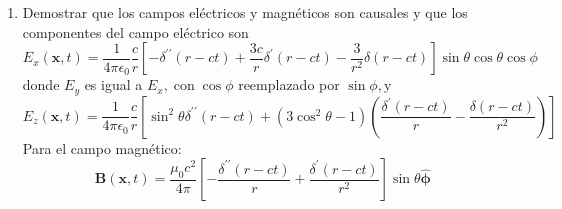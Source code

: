 \documentclass[]{article}
\numberwithin{equation}{section}
\newcommand{\0}{\textcolor{gray}{0}}
\newcommand{\rv}{\mathbf{r}}
\newcommand{\xv}{\mathbf{x}}
\newcommand{\yv}{\mathbf{y}}
\newcommand{\zv}{\mathbf{z}}
\newcommand{\xhat}{\hat{\xv}}
\newcommand{\yhat}{\hat{\yv}}
\newcommand{\zhat}{\hat{\zv}}
\newcommand{\eo}{\epsilon_{0}}
\newcommand{\n}[1]{\mathbf{#1}}
\begin{document}
\begin{enumerate}
\begin{enumerate}
\begin{align*}
			&= \ke \delta'(t)\, \n{e}_{i} \partial_{i}\partial_{z}\left(\frac{1}{r}\right)\\
			&= \ke \delta'(t) \left(\frac{3 x z }{r^5}\xhat + \frac{3 y z }{r^5}\yhat + \frac{3 z^2 - r^2}{r^5} \zhat - \frac{4\pi}{3} \delta(\rv)\zhat \right)\\
			&= \ke \delta'(t) \left(\frac{3z }{r^5} \left[x\xhat + y\yhat + z\zhat\right] - \frac{r^2}{r^5} \zhat - \frac{4\pi}{3} \delta(\rv)\zhat \right)\\
			&= \ke \delta'(t) \left(\frac{3z }{r^5}\rv - \frac{1}{r^3} \zhat - \frac{4\pi}{3} \delta(\rv)\zhat \right)
		\end{align*}
		Finalmente
		\begin{align*}
			\n{J}_{t} &= -\delta(\rv) \delta'(t)\zhat - \eo \ke \delta'(t) \left(\frac{3z }{r^5}\rv - \frac{1}{r^3} \zhat - \frac{4\pi}{3} \delta(\rv)\zhat \right)\\
			&= - \delta'(t)\left[\delta(\rv)\zhat + \frac{3z }{4\pi r^5}\rv - \frac{1}{4\pi r^3} \zhat - \frac{1}{3} \delta(\rv)\zhat \right]\\
			&= - \delta'(t)\left[\frac{3z }{4\pi r^5}\rv - \frac{1}{4\pi r^3} \zhat + \frac{2}{3} \delta(\rv)\zhat \right]
		\end{align*}
		
		\item Demostrar que los campos eléctricos y magnéticos son causales y que los componentes del campo eléctrico son
		\begin{equation*}
			E_x(\mathbf{x}, t)=\frac{1}{4 \pi \epsilon_0} \frac{c}{r}\left[-\delta^{\prime \prime}(r-c t)+\frac{3 c}{r} \delta^{\prime}(r-c t)-\frac{3}{r^2} \delta(r-c t)\right] \sin \theta \cos \theta \cos \phi
		\end{equation*}
		donde $E_y$ es igual a $E_x, \operatorname{con} \cos \phi$ reemplazado por $\sin \phi, \mathrm{y}$
		\begin{equation*}
			E_z(\mathbf{x}, t)=\frac{1}{4 \pi \epsilon_0} \frac{c}{r}\left[\sin ^2 \theta \delta^{\prime \prime}(r-c t)+\left(3 \cos ^2 \theta-1\right)\left(\frac{\delta^{\prime}(r-c t)}{r}-\frac{\delta(r-c t)}{r^2}\right)\right]
		\end{equation*}	
		Para el campo magnético:
		\begin{equation*}
			\mathbf{B}(\mathbf{x}, t)=\frac{\mu_0 c^2}{4 \pi}\left[-\frac{\delta^{\prime \prime}(r-c t)}{r}+\frac{\delta^{\prime}(r-c t)}{r^2}\right] \sin \theta \hat{\boldsymbol{\phi}}
		\end{equation*}
		

\end{enumerate}
\end{enumerate}
\end{document}
